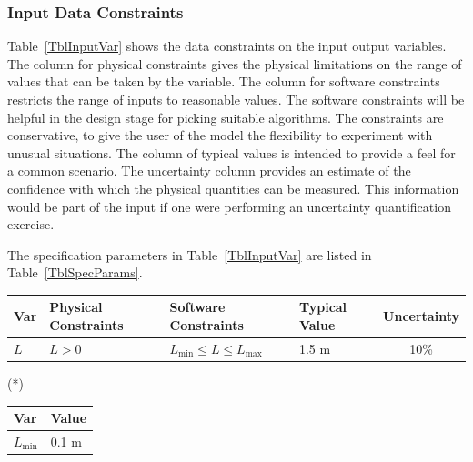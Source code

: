 \documentclass[12pt]{article}
\begin{document}

\subsubsection{Input Data Constraints} \label{sec_DataConstraints}    

Table~\ref{TblInputVar} shows the data constraints on the input output
variables.  The column for physical constraints gives the physical limitations
on the range of values that can be taken by the variable.  The column for
software constraints restricts the range of inputs to reasonable values.  The
software constraints will be helpful in the design stage for picking suitable
algorithms.  The constraints are conservative, to give the user of the model the
flexibility to experiment with unusual situations.  The column of typical values
is intended to provide a feel for a common scenario.  The uncertainty column
provides an estimate of the confidence with which the physical quantities can be
measured.  This information would be part of the input if one were performing an
uncertainty quantification exercise.

The specification parameters in Table~\ref{TblInputVar} are listed in
Table~\ref{TblSpecParams}.

\begin{table}[!h]
  \caption{Input Variables} \label{TblInputVar}
  \renewcommand{\arraystretch}{1.2}
\noindent \begin{longtable*}{l l l l c} 
  \toprule
  \textbf{Var} & \textbf{Physical Constraints} & \textbf{Software Constraints} &
                             \textbf{Typical Value} & \textbf{Uncertainty}\\
  \midrule 
  $L$ & $L > 0$ & $L_{\text{min}} \leq L \leq L_{\text{max}}$ & 1.5 \si[per-mode=symbol] {\metre} & 10\%
  \\
  \bottomrule
\end{longtable*}
\end{table}

\noindent 
\begin{description}
\item[(*)] 
\end{description}

\begin{table}[!h]
\caption{Specification Parameter Values} \label{TblSpecParams}
\renewcommand{\arraystretch}{1.2}
\noindent \begin{longtable*}{l l} 
  \toprule
  \textbf{Var} & \textbf{Value} \\
  \midrule 
  $L_\text{min}$ & 0.1 \si{\metre}\\
  \bottomrule
\end{longtable*}
\end{table}
\end{document}
